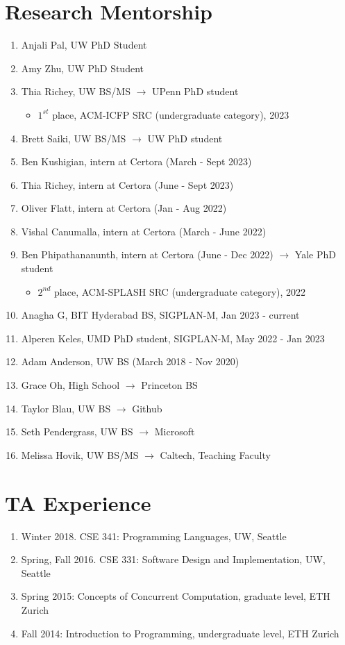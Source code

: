 \documentclass[margin, 10pt]{res} %
\begin{document}
\begin{resume}
\section{Research Mentorship}
\begin{enumerate}
  \item Anjali Pal, UW PhD Student
  \item Amy Zhu, UW PhD Student
  \item Thia Richey, UW BS/MS $\rightarrow$ UPenn PhD student
     \begin{itemize}
       \item $1^{st}$ place, ACM-ICFP SRC (undergraduate category), 2023
     \end{itemize}
  \item Brett Saiki, UW BS/MS $\rightarrow$ UW PhD student
  \item Ben Kushigian, intern at Certora (March - Sept 2023)
  \item Thia Richey, intern at Certora (June - Sept 2023)
  \item Oliver Flatt, intern at Certora (Jan - Aug 2022)
  \item Vishal Canumalla, intern at Certora (March - June 2022)
  \item Ben Phipathananunth, intern at Certora (June - Dec 2022) $\rightarrow$ Yale PhD student
     \begin{itemize}
       \item $2^{nd}$ place, ACM-SPLASH SRC (undergraduate category), 2022
     \end{itemize}
  \item Anagha G, BIT Hyderabad BS, SIGPLAN-M, Jan 2023 - current
  \item Alperen Keles, UMD PhD student, SIGPLAN-M, May 2022 - Jan 2023
  \item Adam Anderson, UW BS (March 2018 - Nov 2020)
  \item Grace Oh, High School $\rightarrow$ Princeton BS
  \item Taylor Blau, UW BS $\rightarrow$ Github
  \item Seth Pendergrass, UW BS $\rightarrow$ Microsoft
  \item Melissa Hovik, UW BS/MS $\rightarrow$ Caltech, Teaching Faculty
\end{enumerate}

\section{TA Experience}
\begin{enumerate}
\item Winter 2018. CSE 341: Programming Languages, UW, Seattle
\item Spring, Fall 2016. CSE 331: Software Design and Implementation, UW, Seattle
\item Spring 2015: Concepts of Concurrent Computation, graduate level, ETH Zurich
\item Fall 2014: Introduction to Programming, undergraduate level, ETH Zurich
\end{enumerate}



\end{resume}
\end{document}
